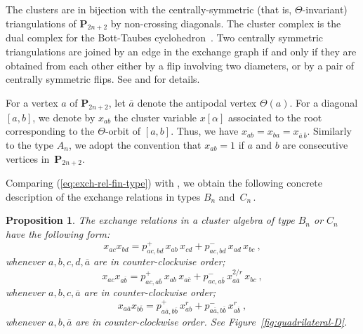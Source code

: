 \documentclass[letterpaper]{amsart}
\numberwithin{equation}{section}
\newtheorem{proposition}[theorem]{Proposition}
\theoremstyle{definition}
\def\PP{\mathbb{P}}
\def\Poly{\mathbf{P}}
\begin{document}
 
The clusters are in bijection with the centrally-symmetric (that is, $\Theta$-invariant) 
triangulations of $\Poly_{2n+2}$ by non-crossing diagonals. 
The cluster complex is the dual complex for the Bott-Taubes 
cyclohedron~\cite{bott-taubes}. 
Two centrally symmetric triangulations are joined by an edge in 
the exchange graph if and only if they are obtained from each other either by a flip 
involving two diameters, or by a pair of centrally symmetric flips. 
See \cite[Section~3.5]{yga} and \cite[Section~4.2]{cfz} for %
details. 
 
For a vertex $a$ of $\Poly_{2n+2}$, let $\overline a$ denote the 
antipodal vertex $\Theta (a)$. 
For a diagonal $[a,b]$, we denote 
by $x_{ab}$ the cluster variable $x[\alpha]$ associated to the 
root corresponding to the $\Theta$-orbit of $[a,b]$. 
Thus, we have $x_{ab} = x_{ba} = x_{\overline a \,\overline b}$. 
Similarly to the type $A_n$, we adopt the convention that $x_{ab} = 1$ if $a$ 
and $b$ are consecutive vertices in~$\Poly_{2n+2}$. 
 
Comparing (\ref{eq:exch-rel-fin-type}) with \cite[Lemma~4.4]{cfz}, 
we obtain the following concrete description of the exchange relations in 
types $B_n$ and~$C_n\,$. 
 
\begin{proposition} 
\label{pr:exchanges-C} 
The exchange relations in a cluster algebra of type $B_n$ or $C_n$ 
have the following form: 
\begin{equation} 
\label{eq:exchange-relation-C-1} 
x_{ac} x_{bd} = 
p^+_{ac,bd}\, 
x_{ab}\, x_{cd} 
+ 
p^-_{ac,bd}\, 
x_{ad}\, x_{bc} \ , 
\end{equation} 
whenever $a,b,c,d,\overline a$ are %
in counter-clockwise order; 
\begin{equation} 
\label{eq:exchange-relation-C-2} 
x_{ac} x_{a \overline b} = 
p^+_{ac,a \overline b}\, 
x_{ab}\, x_{a \overline c} 
+ 
p^-_{ac,a\overline b}\, 
x_{a \overline a}^{2/r} \, x_{bc} \ , 
\end{equation} 
whenever $a,b,c,\overline a$ are %
in counter-clockwise order; 
\begin{equation} 
\label{eq:exchange-relation-C-3} 
x_{a\overline a} x_{b \overline b} = 
p^+_{a\overline a,b \overline b}\, 
x_{ab}^r 
+ 
p^-_{a\overline a,b\overline b}\, 
x_{a \overline b}^r \ , 
\end{equation} 
whenever $a,b,\overline a$ are %
in counter-clockwise order. 
See Figure~\ref{fig:quadrilateral-D}. 
\end{proposition} 
 
\end{document}
